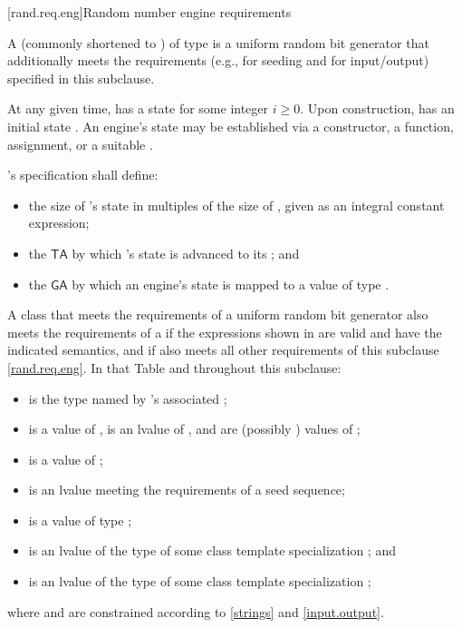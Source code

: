 [rand.req.eng]{Random number engine requirements}%
%

\pnum
A 
(commonly shortened to )
 of type 
is a uniform random bit generator
that additionally meets the requirements
(e.g., for seeding and for input/output)
specified in this subclause.

\pnum
At any given time,
 has a state 
for some integer $i \geq 0$.
Upon construction,
has an initial state .
An engine's state may be established via
 a constructor,
 a  function,
 assignment,
 or a suitable .

\pnum
{}'s specification shall define:
\begin{itemize}
 \item
   the size of 's state
   in multiples of the size of ,
   given as an integral constant expression;
 \item
   the 
   $\mathsf{TA}$
   by which 's state 
   is advanced to its 
   ;
 and
 \item
   the 
   $\mathsf{GA}$
   by which an engine's state is mapped
   to a value of type .
\end{itemize}

\pnum
A class 
that meets the requirements
of a uniform random bit generator
also meets the requirements
of a 
if the expressions shown
in 
are valid and have the indicated semantics,
and if  also meets all other requirements
of this subclause \ref{rand.req.eng}.
In that Table and throughout this subclause:
\begin{itemize}
  \item
     is the type named by
    's associated ;
  \item
     is a value of ,
     is an lvalue of ,
     and  are (possibly ) values of ;
  \item
     is a value of ;
  \item
     is an lvalue
    meeting the requirements of a seed sequence;
  \item
     is a value
    of type ;
  \item
     is an lvalue of the type of some class template specialization
     ;
  and
  \item
     is an lvalue of the type of some class template specialization
     ;
\end{itemize}
where  and  are constrained
according to \ref{strings} and \ref{input.output}.

